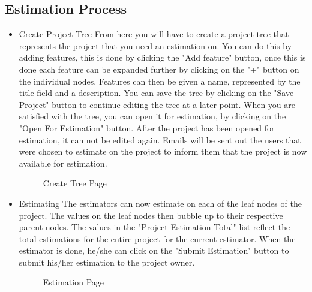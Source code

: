 \subsection{Estimation Process}
\begin{itemize}
	\item{Create Project Tree}
	\newline
	From here you will have to create a project tree that represents the project that you need an estimation on. You can do this by adding features, this is done by clicking the "Add feature" button, once this is done each feature can be expanded further by clicking on the "+" button on the individual nodes. Features can then be given a name, represented by the title field and a description. You can save the tree by clicking on the "Save Project" button to continue editing the tree at a later point. When you are satisfied with the tree, you can open it for estimation, by clicking on the "Open For Estimation" button. After the project has been opened for estimation, it can not be edited again. Emails will be sent out the users that were chosen to estimate on the project to inform them that the project is now available for estimation.
	\begin{figure}[H]
	    	\centering
	    	\caption{Create Tree Page}
	    	\label{fig:Learning rate 0.1}
   	\end{figure}
	\item{Estimating}
	\newline
	The estimators can now estimate on each of the leaf nodes of the project. The values on the leaf nodes then bubble up to their respective parent nodes. The values in the "Project Estimation Total" list reflect the total estimations for the entire project for the current estimator. When the estimator is done, he/she can click on the "Submit Estimation" button to submit his/her estimation to the project owner.
	\begin{figure}[H]
	    	\centering
	    	\caption{Estimation Page}
	    	\label{fig:Learning rate 0.1}
   	\end{figure}
\end{itemize}

